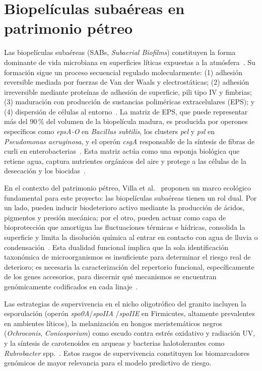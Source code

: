 \section{Biopelículas subaéreas en patrimonio pétreo}
\label{sec:biopelículas}

Las biopelículas subaéreas (SABs, \textit{Subaerial Biofilms})
constituyen la forma dominante de vida microbiana en superficies
líticas expuestas a la atmósfera~\cite{villa2016}. Su formación sigue
un proceso secuencial regulado molecularmente: (1) adhesión reversible
mediada por fuerzas de Van der Waals y electrostáticas; (2) adhesión
irreversible mediante proteínas de adhesión de superficie, pili tipo IV
y fimbrias; (3) maduración con producción de sustancias poliméricas
extracelulares (EPS); y (4) dispersión de células al
entorno~\cite{flemming2010}. La matriz de EPS, que puede representar más del 90\,\% del volumen de la biopelícula madura, es producida
por operones específicos como \textit{epsA-O} en
\textit{Bacillus subtilis}, los clusters \textit{pel} y \textit{psl} en
\textit{Pseudomonas aeruginosa}, y el operón \textit{csgA} responsable
de la síntesis de fibras de curli en
enterobacterias~\cite{flemming2010}. Esta matriz actúa como una esponja
biológica que retiene agua, captura nutrientes orgánicos del aire y
protege a las células de la desecación y los
biocidas~\cite{flemming2010, cappitelli2020}.

En el contexto del patrimonio pétreo, Villa et al.~\cite{villa2016}
proponen un marco ecológico fundamental para este proyecto: las
biopelículas subaéreas tienen un rol dual. Por un lado, pueden
inducir biodeterioro activo mediante la producción de ácidos, pigmentos
y presión mecánica; por el otro, pueden actuar como capa de
bioprotección que amortigua las fluctuaciones térmicas e hídricas,
consolida la superficie y limita la disolución química al entrar en
contacto con agua de lluvia o condensación~\cite{villa2016,
cappitelli2020}. Esta dualidad funcional implica que la sola
identificación taxonómica de microorganismos es insuficiente para
determinar el riesgo real de deterioro; es necesaria la caracterización
del repertorio funcional, específicamente de los genes accesorios,
para discernir qué mecanismos se encuentran genómicamente codificados
en cada linaje~\cite{cappitelli2020, skipper2022}.

Las estrategias de supervivencia en el nicho oligotrófico del granito
incluyen la esporulación (operón \textit{spo0A}/\textit{spoIIA}
/\textit{spoIIE} en Firmicutes, altamente prevalentes en ambientes
líticos), la melanización en hongos meristemáticos negros
(\textit{Ochroconis}, \textit{Coniosporium}) como escudo contra estrés
oxidativo y radiación UV, y la síntesis de carotenoides en
arqueas y bacterias halotolerantes como \textit{Rubrobacter}
spp.~\cite{zanardini2019, skipper2022, alonso2025, sterflinger2013,Galperin2022,branysova2022}. Estos rasgos
de supervivencia constituyen los biomarcadores genómicos de mayor
relevancia para el modelo predictivo de riesgo.

